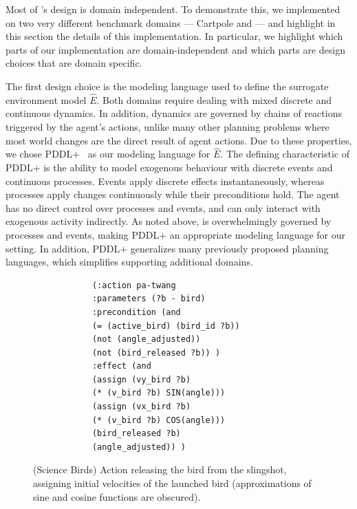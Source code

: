 Most of \hydra's design is domain independent. To demonstrate this, we implemented \hydra on two very different benchmark domains --- Cartpole and \sbirds --- and highlight in this section the details of this implementation. In particular, we highlight which parts of our implementation are domain-independent and which parts are design choices that are domain specific. 


The first design choice is the modeling language used to define the surrogate environment model $\hat{E}$. 
Both domains require dealing with mixed discrete and continuous dynamics. In addition, \sbirds dynamics are governed by chains of reactions triggered by the agent's actions, unlike many other planning problems where most world changes are the direct result of agent actions. 
Due to these properties, we chose PDDL+~\cite{fox2006modelling} as our modeling language for $\hat{E}$. 
The defining characteristic of PDDL+ is the ability to model exogenous behaviour with discrete events and continuous processes.
Events apply discrete effects instantaneously, whereas processes apply changes continuously while their preconditions hold. The agent has no direct control over processes and events, and can only interact with exogenous activity indirectly. As noted above, \sbirds is overwhelmingly governed by processes and events, making PDDL+ an appropriate modeling language for our setting.  
In addition, PDDL+ generalizes many previously proposed planning languages, which simplifies supporting additional domains.




\begin{figure}
	\begin{center}
		\fontsize{8pt}{10pt}\selectfont
		\begin{verbatim}
			(:action pa-twang
			:parameters (?b - bird)
			:precondition (and
			(= (active_bird) (bird_id ?b))
			(not (angle_adjusted))
			(not (bird_released ?b)) )
			:effect (and
			(assign (vy_bird ?b) 
			(* (v_bird ?b) SIN(angle)))
			(assign (vx_bird ?b) 
			(* (v_bird ?b) COS(angle)))
			(bird_released ?b)
			(angle_adjusted)) )
		\end{verbatim}
		\caption{(Science Birds) Action releasing the bird from the slingshot, assigning initial velocities of the launched bird (approximations of sine and cosine functions are obscured).}
		\label{fig:action-pa-twang}
	\end{center}
\end{figure}



